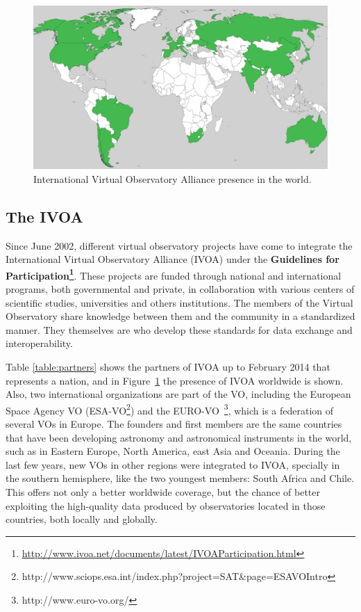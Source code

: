\normalsize

\begin{figure}%
\begin{center}
	\includegraphics[width=0.9\linewidth]{img/VO-worldwide.png}
	\caption{International Virtual Observatory Alliance presence in the world.}
\label{figure:worldview}
\end{center}
\end{figure}

\subsection{The IVOA}

Since June 2002, different virtual observatory projects have come to integrate the
International Virtual Observatory Alliance (IVOA) under the \textbf{Guidelines
for Participation\footnote{\url{http://www.ivoa.net/documents/latest/IVOAParticipation.html}}}. 
These projects are funded through national and international programs, both governmental and 
private, in collaboration with various centers of scientific studies, universities and
others institutions. The members of the Virtual Observatory share
knowledge between them and the community in a standardized manner. They
themselves are who develop these standards for data exchange and
interoperability.

Table \ref{table:partners} shows the partners of IVOA up to
February 2014 that represents a nation, and in Figure~\ref{figure:worldview} the
presence of IVOA worldwide is shown. Also, two international organizations
are part of the VO, including the European Space Agency VO
(ESA-VO\footnote{http://www.sciops.esa.int/index.php?project=SAT\&page=ESAVOIntro})
and the EURO-VO~\footnote{http://www.euro-vo.org/}, which is a federation of several VOs in Europe.
The founders and first members are the same countries that have
been developing astronomy and astronomical instruments in the world, 
such as in Eastern Europe, North America, east Asia and Oceania. During the last few years,
new VOs in other regions were integrated to IVOA, specially in the southern
hemisphere, like the two youngest members: South Africa and Chile. 
This offers not only a better worldwide coverage, but the chance of
better exploiting the high-quality data produced by observatories 
located in those countries, both locally and globally. 

